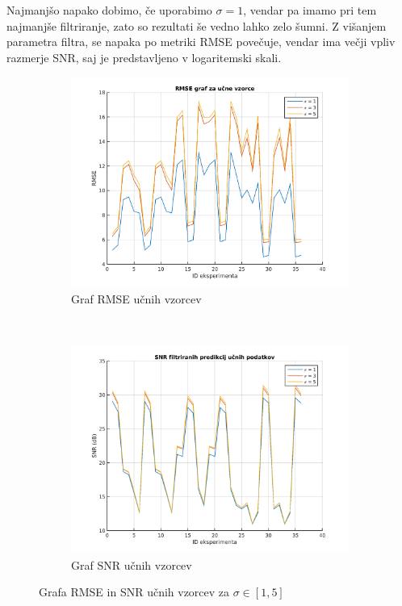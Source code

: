Najmanjšo napako dobimo, če uporabimo $\sigma=1$, vendar pa imamo pri tem najmanjše filtriranje, zato so rezultati še vedno lahko zelo šumni. Z višanjem parametra filtra, se napaka po metriki RMSE povečuje, vendar ima večji vpliv razmerje SNR, saj je predstavljeno v logaritemski skali. 

\begin{figure}[htb]
\centering
\begin{subfigure}[t]{0.45\columnwidth}
\includegraphics[width=\columnwidth]{./Slike/sigma-rmse1-5.png}
\caption{Graf RMSE  učnih vzorcev }
\label{fig:sigma-rmse1-5}
\end{subfigure}
~
\begin{subfigure}[t]{0.45\columnwidth}
\includegraphics[width=\columnwidth]{./Slike/sigma-snr1-5.png}
\caption{Graf SNR  učnih vzorcev}
\label{fig:sigma-snr1-5}
\end{subfigure}
\caption{Grafa RMSE in SNR učnih vzorcev za \mbox{$\sigma \in [1,5]$}}
\label{fig:sigma1-5}
\end{figure}

